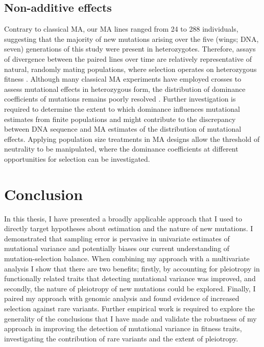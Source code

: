 \subsection{Non-additive effects}
Contrary to classical MA, our MA lines ranged from 24 to 288 individuals, suggesting that the majority of new mutations arising over the five (wings; DNA, seven) generations of this study were present in heterozygotes. Therefore, assays of divergence between the paired lines over time are relatively representative of natural, randomly mating populations, where selection operates on heterozygous fitness \citep{Simm77}. Although many classical MA experiments have employed crosses to assess mutational effects in heterozygous form, the distribution of dominance coefficients of mutations remains poorly resolved \citep{Lync98, Hall09, Agra11}. Further investigation is required to determine the extent to which dominance influences mutational estimates from finite populations and might contribute to the discrepancy between DNA sequence and MA estimates of the distribution of mutational effects. Applying population size treatments in MA designs allow the threshold of neutrality to be manipulated, where the dominance coefficients at different opportunities for selection can be investigated. \par

\section{Conclusion}
In this thesis, I have presented a broadly applicable approach that I used to directly target hypotheses about estimation and the nature of new mutations.  I demonstrated that sampling error is pervasive in univariate estimates of mutational variance and potentially biases our current understanding of mutation-selection balance.  When combining my approach with a multivariate analysis I show that there are two benefits; firstly, by accounting for pleiotropy in functionally related traits that detecting mutational variance was improved, and secondly, the nature of pleiotropy of new mutations could be explored.  Finally,  I paired my approach with genomic analysis and found evidence of increased selection against rare variants. Further empirical work is required to explore the generality of the conclusions that I have made and validate the robustness of my approach in improving the detection of mutational variance in fitness traits,  investigating the contribution of rare variants and the extent of pleiotropy.  